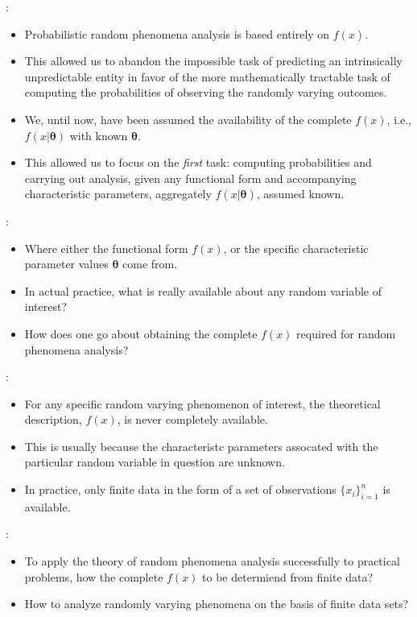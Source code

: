 \documentclass[twoside]{article}
\theoremstyle{definition}
\theoremstyle{remark}
\theoremstyle{remark}
\begin{document}
:
\begin{itemize}
  \item Probabilistic random phenomena analysis is based entirely on $f(x)$.
  \item This allowed us to abandon the impossible task of predicting an
  intrinsically unpredictable entity in favor of the more mathematically
  tractable task of computing the probabilities of observing the randomly
  varying outcomes.
  \item We, until now, have been assumed the availability of the complete $f(x)$,
  i.e., $f(x|\boldsymbol{\theta})$ with known $\boldsymbol{\theta}$.
  \item This allowed us to focus on the \textit{first} task: computing
  probabilities and carrying out analysis, given any functional form and
  accompanying characteristic parameters, aggregately $f(x|\boldsymbol{\theta})$,
  assumed known.
\end{itemize}

:
\begin{itemize}
  \item Where either the functional form $f(x)$, or the specific characteristic
  parameter values $\boldsymbol{\theta}$ come from.
  \item In actual practice, what is really available about any random variable
  of interest?
  \item How does one go about obtaining the complete $f(x)$ required for random
  phenomena analysis?
\end{itemize}

:
\begin{itemize}
  \item For any specific random varying phenomenon of interest, the theoretical
  description, $f(x)$, is never completely available.
  \item This is usually because the characteristc parameters assocated with
  the particular random variable in question are unknown.
  \item In practice, only finite data in the form of a set of observations
  ${\{ x_i \}}_{i=1}^{n}$ is available.
\end{itemize}

:
\begin{itemize}
  \item To apply the theory of random phenomena analysis successfully to
  practical problems, how the complete $f(x)$ to be determiend from finite
  data?
  \item How to analyze randomly varying phenomena on the basis of finite data
  sets?
\end{itemize}
\end{document}
